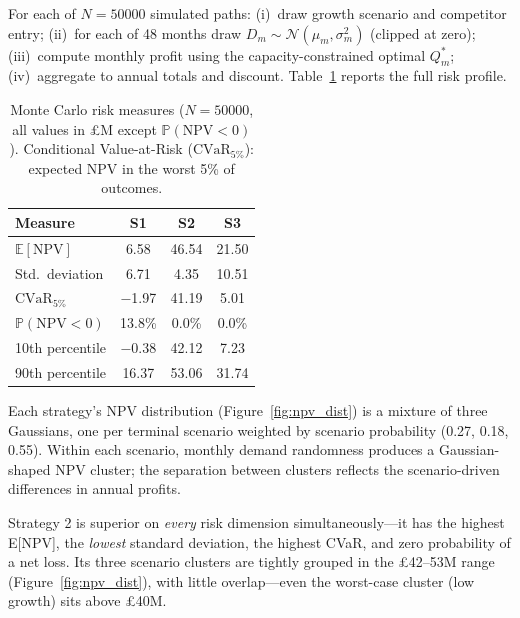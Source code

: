 \documentclass[10pt,a4paper]{article}
\newcommand{\E}{\mathbb{E}}
\newcommand{\Prob}{\mathbb{P}}
\begin{document}
For each of $N = 50000$ simulated paths: (i)~draw growth scenario and competitor entry; (ii)~for each of 48 months draw $D_m \sim \mathcal{N}(\mu_m, \sigma_m^2)$ (clipped at zero); (iii)~compute monthly profit using the capacity-constrained optimal $Q_m^*$; (iv)~aggregate to annual totals and discount. Table~\ref{tab:risk} reports the full risk profile.

\begin{table}[H]
    \centering
    \caption{Monte Carlo risk measures ($N = 50000$, all values in £M except $\Prob(\mathrm{NPV}<0)$). Conditional Value-at-Risk ($\mathrm{CVaR}_{5\%}$): expected NPV in the worst 5\% of outcomes.}
    \label{tab:risk}
    \small
    \begin{tabular}{@{}lccc@{}}
        \toprule
        \textbf{Measure}        & \textbf{S1} & \textbf{S2} & \textbf{S3} \\
        \midrule
        $\E[\mathrm{NPV}]$      & 6.58        & 46.54       & 21.50       \\
        Std.\ deviation         & 6.71        & 4.35        & 10.51       \\
        $\mathrm{CVaR}_{5\%}$   & $-$1.97     & 41.19       & 5.01        \\
        $\Prob(\mathrm{NPV}<0)$ & 13.8\%      & 0.0\%       & 0.0\%       \\
        10th percentile         & $-$0.38     & 42.12       & 7.23        \\
        90th percentile         & 16.37       & 53.06       & 31.74       \\
        \bottomrule
    \end{tabular}
\end{table}

Each strategy's NPV distribution (Figure~\ref{fig:npv_dist}) is a mixture of three Gaussians, one per terminal scenario weighted by scenario probability (0.27, 0.18, 0.55). Within each scenario, monthly demand randomness produces a Gaussian-shaped NPV cluster; the separation between clusters reflects the scenario-driven differences in annual profits.

Strategy 2 is superior on \textit{every} risk dimension simultaneously---it has the highest E[NPV], the \textit{lowest} standard deviation, the highest CVaR, and zero probability of a net loss. Its three scenario clusters are tightly grouped in the \pounds42--53M range (Figure~\ref{fig:npv_dist}), with little overlap---even the worst-case cluster (low growth) sits above \pounds40M.
\end{document}
